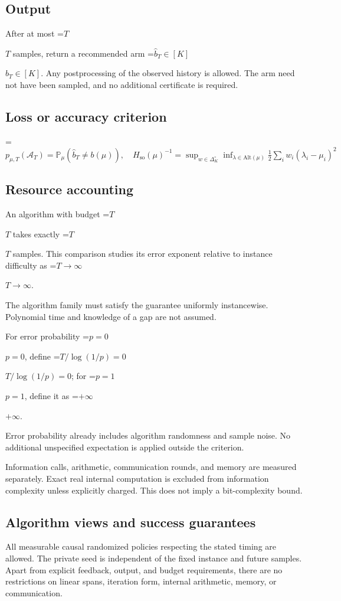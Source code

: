 \documentclass[10pt,a4paper]{article}
\newcommand{\AtlasMath}[1]{\par\begingroup\centering\setbox0=\hbox{$\displaystyle #1$}\ifdim\wd0>1.4\linewidth\typeout{ATLAS WIDE FORMULA: \the\wd0}\fi\ifdim\wd0>\linewidth\resizebox{\linewidth}{!}{\box0}\else\box0\fi\par\endgroup}
\newcommand{\AtlasInlineMath}[1]{\begingroup\setbox0=\hbox{$#1$}\ifdim\wd0>.4\linewidth\endgroup\AtlasMath{#1}\else\endgroup$#1$\fi}
\begin{document}
\subsection{Output}
After at most \AtlasInlineMath{T} samples, return a recommended arm \AtlasInlineMath{\widehat{b}_T\in[K]}. Any postprocessing of the observed history is allowed. The arm need not have been sampled, and no additional certificate is required.

\subsection{Loss or accuracy criterion}

\AtlasMath{p_{\mu,T}(\mathcal{A}_T)=\mathbb{P}_\mu(\widehat{b}_T\ne b(\mu)),\quad H_{\mathrm{so}}(\mu)^{-1}=\sup_{w\in\Delta_K^\circ}\inf_{\lambda\in\mathrm{Alt}(\mu)}\frac12\sum_i w_i(\lambda_i-\mu_i)^2}


\subsection{Resource accounting}
An algorithm with budget \AtlasInlineMath{T} takes exactly \AtlasInlineMath{T} samples. This comparison studies its error exponent relative to instance difficulty as \AtlasInlineMath{T\to\infty}.

The algorithm family must satisfy the guarantee uniformly instancewise. Polynomial time and knowledge of a gap are not assumed.

For error probability \AtlasInlineMath{p=0}, define \AtlasInlineMath{T/\log(1/p)=0}; for \AtlasInlineMath{p=1}, define it as \AtlasInlineMath{+\infty}.

Error probability already includes algorithm randomness and sample noise. No additional unspecified expectation is applied outside the criterion.

Information calls, arithmetic, communication rounds, and memory are measured separately. Exact real internal computation is excluded from information complexity unless explicitly charged. This does not imply a bit-complexity bound.

\subsection{Algorithm views and success guarantees}
All measurable causal randomized policies respecting the stated timing are allowed. The private seed is independent of the fixed instance and future samples. Apart from explicit feedback, output, and budget requirements, there are no restrictions on linear spans, iteration form, internal arithmetic, memory, or communication.
\end{document}

